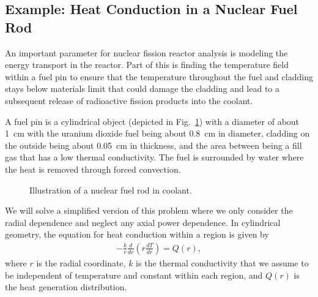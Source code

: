 \subsection{Example: Heat Conduction in a Nuclear Fuel Rod} \label{Sec:ode_boundaryValues_heatConductionExample}

An important parameter for nuclear fission reactor analysis is modeling the energy transport in the reactor. Part of this is finding the temperature field within a fuel pin to ensure that the temperature throughout the fuel and cladding stays below materials limit that could damage the cladding and lead to a subsequent release of radioactive fission products into the coolant. 

A fuel pin is a cylindrical object (depicted in Fig.~\ref{Fig:ode_nuclearFuelRodGeometry}) with a diameter of about 1~cm with the uranium dioxide fuel being about 0.8~cm in diameter, cladding on the outside being about 0.05~cm in thickness, and the area between being a fill gas that has a low thermal conductivity. The fuel is surrounded by water where the heat is removed through forced convection. 

\begin{figure}[tb!]
\begin{center}
\caption{Illustration of a nuclear fuel rod in coolant.}
\label{Fig:ode_nuclearFuelRodGeometry}
\end{center}
\end{figure}


We will solve a simplified version of this problem where we only consider the radial dependence and neglect any axial power dependence. In cylindrical geometry, the equation for heat conduction within a region is given by
\begin{align}
  -\frac{k}{r} \frac{d}{dr} \left( r \frac{dT}{dr} \right) = Q(r),
\end{align}
where $r$ is the radial coordinate, $k$ is the thermal conductivity that we assume to be independent of temperature and constant within each region, and $Q(r)$ is the heat generation distribution.

